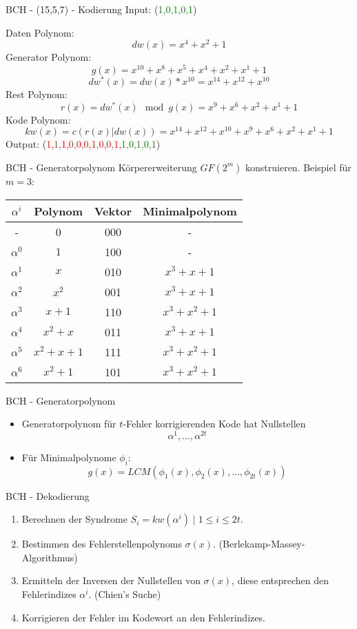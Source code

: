 \documentclass[xcolor=dvipsnames]{beamer}
\newcommand{\semfootnote}[1]{\let\thefootnote\relax\footnotetext{#1}}
\begin{document}
\begin{frame}{BCH - (15,5,7) - Kodierung}
Input: (\textcolor{green}{1,0,1,0,1})

Daten Polynom: \[dw(x) = x^{4} + x^{2} + 1\]
\pause
Generator Polynom:
\[g(x) = x^{10} + x^{8} + x^{5} + x^{4} + x^{2} + x^{1} + 1\]
\[ dw^*(x) = dw(x)*x^{10} = x^{14} + x^{12} + x^{10}\] 
\pause
Rest Polynom:
\[r(x) = dw^*(x)\mod g(x) = x^{9} + x^{6} + x^{2} + x^{1} + 1\] 
\pause
Kode Polynom:
\[kw(x) = c( r(x)|dw(x) ) = x^{14} + x^{12} + x^{10} + x^{9} + x^{6} + x^{2} + x^{1} + 1\]
Output:
(\textcolor{red}{1,1,1,0,0,0,1,0,0,1,}\textcolor{green}{1,0,1,0,1})
\end{frame}

\begin{frame}{BCH - Generatorpolynom}
Körpererweiterung $GF(2^m)$ konstruieren. Beispiel für $m=3$:
\pause
\begin{center}
\begin{tabular}{c|c|c|c}
$\alpha^i$ & Polynom & Vektor & Minimalpolynom\\
\hline
- & 0 & 000 & - \\
$\alpha^0$ & $1$ & 100 & - \\
$\alpha^1$ & $x$ & 010 & $x^3+x+1$ \\
$\alpha^2$ & $x^2$ & 001  & $x^3+x+1$ \\
$\alpha^3$ & $x+1$ & 110  & $x^3+x^2+1$ \\
$\alpha^4$ & $x^2+x$ & 011  & $x^3+x+1$ \\
$\alpha^5$ & $x^2+x+1$ & 111  & $x^3+x^2+1$ \\
$\alpha^6$ & $x^2+1$ & 101  & $x^3+x^2+1$  \\
\end{tabular}
\end{center}
\end{frame}

\begin{frame}{BCH - Generatorpolynom}
\begin{itemize}[<+->]
\item Generatorpolynom für $t$-Fehler korrigierenden Kode hat Nullstellen $$\alpha^1,...,\alpha^{2t}$$
\item Für Minimalpolynome $\phi_i$: $$g(x) = LCM(\phi_1(x),\phi_2(x),...,\phi_{2t}(x))$$
\end{itemize}
\end{frame}

\begin{frame}{BCH - Dekodierung}
\begin{enumerate}[<+->]
\item Berechnen der Syndrome $S_i = kw(\alpha^i) \mid 1 \leq i \leq 2t$.
\item Bestimmen des Fehlerstellenpolynoms $\sigma(x)$. (Berlekamp-Massey-Algorithmus)
\item Ermitteln der Inversen der Nullstellen von $\sigma(x)$, diese entsprechen den Fehlerindizes $\alpha^i$. (Chien's Suche)
\item Korrigieren der Fehler im Kodewort an den Fehlerindizes.
\end{enumerate}
\semfootnote{Quelle: [2]}
\end{frame}
\end{document}
